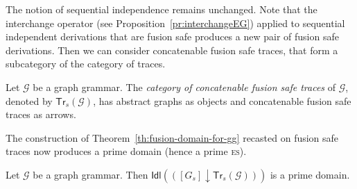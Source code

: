 \documentclass[conference]{IEEEtran}
\newcommand{\ideal}[1]{\ensuremath{\mathsf{Idl}({#1})}}
\newcommand{\esabbr}{\textsc{es}}
\newcommand{\slice}[2]{\ensuremath{({#1} \downarrow {#2})}}
\newcommand{\trs}[1]{\ensuremath{\mathsf{Tr}_s({#1})}}
\begin{document}
The notion of sequential independence remains unchanged. Note that the interchange operator (see Proposition~\ref{pr:interchangeEG}) 
applied to sequential independent derivations that are fusion safe produces a new pair of fusion safe 
derivations. 
%
Then we can consider concatenable fusion safe traces, that form a subcategory of the category of traces.

\begin{definition}
  \label{de:abs-shift-cat-2}
  Let $\mathcal{G}$ be a graph grammar.  The \emph{category of
    concatenable fusion safe traces} of $\mathcal{G}$, denoted by
  \trs{\mathcal{G}}, has abstract graphs as objects and concatenable
  fusion safe traces as arrows.
\end{definition}

The construction of Theorem~\ref{th:fusion-domain-for-gg} recasted on
fusion safe traces now produces a prime domain (hence a
prime {\esabbr}).

\begin{theorem}
  Let $\mathcal{G}$ be a graph grammar. Then
  $\ideal{\slice{[G_s]}{\trs{\mathcal{G}}}}$ is a prime domain.
\end{theorem}
\end{document}
